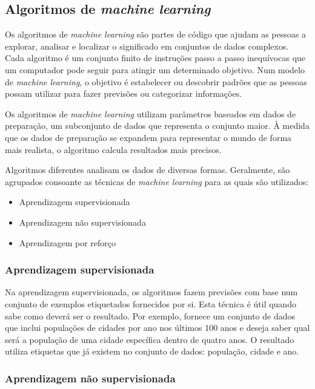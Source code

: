 \documentclass[a4paper,10pt]{article}
\begin{document}
\subsection{Algoritmos de \textit{machine learning}}

Os algoritmos de \textit{machine learning} são partes de código que ajudam as pessoas a explorar, analisar e localizar o significado em conjuntos de dados complexos.
Cada algoritmo é um conjunto finito de instruções passo a passo inequívocas que um computador pode seguir para atingir um determinado objetivo.
Num modelo de \textit{machine learning}, o objetivo é estabelecer ou descobrir padrões que as pessoas possam utilizar para fazer previsões ou categorizar informações.

Os algoritmos de \textit{machine learning} utilizam parâmetros baseados em dados de preparação, um subconjunto de dados que representa o conjunto maior.
À medida que os dados de preparação se expandem para representar o mundo de forma mais realista, o algoritmo calcula resultados mais precisos.

Algoritmos diferentes analisam os dados de diversas formas.
Geralmente, são agrupados consoante as técnicas de \textit{machine learning} para as quais são utilizados:
\begin{itemize}
    \item Aprendizagem supervisionada
    \item Aprendizagem não supervisionada
    \item Aprendizagem por reforço
\end{itemize}

\subsubsection{Aprendizagem supervisionada}

Na aprendizagem supervisionada, os algoritmos fazem previsões com base num conjunto de exemplos etiquetados fornecidos por si.
Esta técnica é útil quando sabe como deverá ser o resultado.
Por exemplo, fornece um conjunto de dados que inclui populações de cidades por ano nos últimos 100 anos e deseja saber qual será a população de uma cidade específica dentro de quatro anos.
O resultado utiliza etiquetas que já existem no conjunto de dados: população, cidade e ano.

\subsubsection{Aprendizagem não supervisionada}
\end{document}
